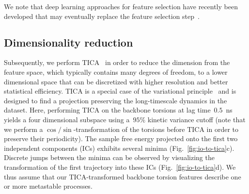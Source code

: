 \documentclass[9pt,tutorial]{livecoms}
\begin{document}
We note that deep learning approaches for feature selection have recently been developed that may eventually replace the feature selection step~\cite{vampnet,tae,hernandez-vde}.

\subsection{Dimensionality reduction}

Subsequently, we perform TICA~\cite{tica,kinetic-maps} in order to reduce the dimension from the feature space,
which typically contains many degrees of freedom,
to a lower dimensional space that can be discretized with higher resolution and better statistical efficiency.
TICA is a special case of the variational principle~\cite{noe-vac,nueske-vamk} and is designed to find a projection preserving the long-timescale dynamics in the dataset.
Here, performing TICA on the backbone torsions at lag time~$0.5$~ns yields a four dimensional subspace using a~$95\%$ kinetic variance cutoff
(note that we perform a $\cos/\sin$-transformation of the torsions before TICA in order to preserve their periodicity).
The sample free energy projected onto the first two independent components (ICs) exhibits several minima (Fig.~\ref{fig:io-to-tica}c).
Discrete jumps between the minima can be observed by visualizing the transformation of the first trajectory into these ICs (Fig.~\ref{fig:io-to-tica}d).
We thus assume that our TICA-transformed backbone torsion features describe one or more metastable processes.
\end{document}
